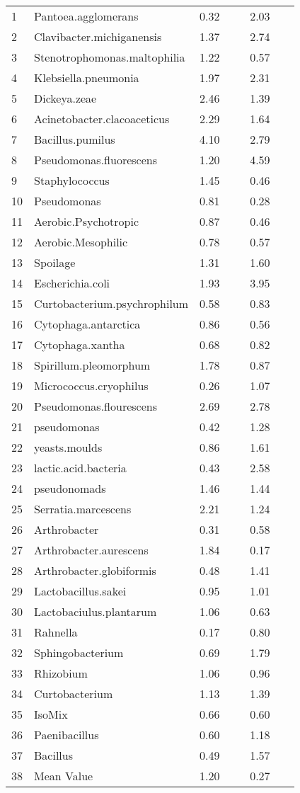 \begin{longtable}{p{0.06\linewidth} p{0.33\linewidth} p{0.21\linewidth} p{0.21\linewidth}}
1 & Pantoea.agglomerans & 0.32 & 2.03 \\ 
  2 & Clavibacter.michiganensis & 1.37 & 2.74 \\ 
  3 & Stenotrophomonas.maltophilia & 1.22 & 0.57 \\ 
  4 & Klebsiella.pneumonia & 1.97 & 2.31 \\ 
  5 & Dickeya.zeae & 2.46 & 1.39 \\ 
  6 & Acinetobacter.clacoaceticus & 2.29 & 1.64 \\ 
  7 & Bacillus.pumilus & 4.10 & 2.79 \\ 
  8 & Pseudomonas.fluorescens & 1.20 & 4.59 \\ 
  9 & Staphylococcus & 1.45 & 0.46 \\ 
  10 & Pseudomonas & 0.81 & 0.28 \\ 
  11 & Aerobic.Psychotropic & 0.87 & 0.46 \\ 
  12 & Aerobic.Mesophilic & 0.78 & 0.57 \\ 
  13 & Spoilage & 1.31 & 1.60 \\ 
  14 & Escherichia.coli & 1.93 & 3.95 \\ 
  15 & Curtobacterium.psychrophilum & 0.58 & 0.83 \\ 
  16 & Cytophaga.antarctica & 0.86 & 0.56 \\ 
  17 & Cytophaga.xantha & 0.68 & 0.82 \\ 
  18 & Spirillum.pleomorphum & 1.78 & 0.87 \\ 
  19 & Micrococcus.cryophilus & 0.26 & 1.07 \\ 
  20 & Pseudomonas.flourescens & 2.69 & 2.78 \\ 
  21 & pseudomonas & 0.42 & 1.28 \\ 
  22 & yeasts.moulds & 0.86 & 1.61 \\ 
  23 & lactic.acid.bacteria & 0.43 & 2.58 \\ 
  24 & pseudonomads & 1.46 & 1.44 \\ 
  25 & Serratia.marcescens & 2.21 & 1.24 \\ 
  26 & Arthrobacter & 0.31 & 0.58 \\ 
  27 & Arthrobacter.aurescens & 1.84 & 0.17 \\ 
  28 & Arthrobacter.globiformis & 0.48 & 1.41 \\ 
  29 & Lactobacillus.sakei & 0.95 & 1.01 \\ 
  30 & Lactobaciulus.plantarum & 1.06 & 0.63 \\ 
  31 & Rahnella & 0.17 & 0.80 \\ 
  32 & Sphingobacterium & 0.69 & 1.79 \\ 
  33 & Rhizobium & 1.06& 0.96 \\ 
  34 & Curtobacterium & 1.13 & 1.39 \\ 
  35 & IsoMix & 0.66 & 0.60 \\ 
  36 & Paenibacillus & 0.60 & 1.18 \\ 
  37 & Bacillus & 0.49 & 1.57 \\ 
  38 & Mean Value & 1.20 & 0.27 \\ 
   \hline



\end{longtable}
